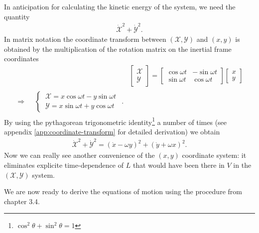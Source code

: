 In anticipation for calculating the kinetic energy of the system, we need the quantity
\begin{align}
\dot{\mathscr{X}}^2 + \dot{\mathscr{Y}}^2.
\end{align}
In matrix notation the coordinate transform between $(\mathscr{X},\mathscr{Y})$ and $(x,y)$ is obtained by the multiplication of the rotation matrix on the inertial frame coordinates
\begin{align}
\nonumber &\begin{bmatrix}
  \mathscr{X} \\
  \mathscr{Y}
\end{bmatrix}
=
\begin{bmatrix}
  \cos{\omega t} & -\sin{\omega t} \\
  \sin{\omega t} & \cos{\omega t}
\end{bmatrix}
\begin{bmatrix}
  x \\
  y
\end{bmatrix} \\[0.2cm]
\label{eq:coordinate-transform}
\Rightarrow
\begin{split}
&\begin{cases}
\ \mathscr{X} = x\cos{\omega t} - y\sin{\omega t} \\
\ \mathscr{Y} = x\sin{\omega t} + y\cos{\omega t}
\end{cases}
\end{split}.
\end{align}
By using the pythagorean trigonometric identity\footnote{$\cos^2{\theta} + \sin^2{\theta} = 1$} a number of times (see appendix \ref{app:coordinate-transform} for detailed derivation) we obtain
\begin{align}
\mathscr{\dot{\mathscr{X}}}^2 + \mathscr{\dot{\mathscr{Y}}}^2 = (\dot{x}-\omega y)^2 + (\dot{y}+\omega x)^2.
\end{align}
Now we can really see another convenience of the $(x,y)$ coordinate system: it eliminates explicite time-dependence of $L$ that would have been there in $V$ in the $(\mathscr{X},\mathscr{Y})$ system.

We are now ready to derive the equations of motion using the procedure from chapter 3.4.
